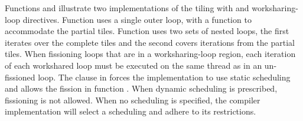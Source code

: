 Functions  and  illustrate two implementations of the tiling
with  and worksharing-loop directives.  Function  uses a single outer loop, with a  function
to accommodate the partial tiles. Function 
uses two sets of nested loops, the first iterates over the complete tiles and the
second covers iterations from the partial tiles. When fissioning loops that
are in a  worksharing-loop region, each iteration of each workshared loop
must be executed on the same thread as in an un-fissioned loop.  The  clause in 
forces the implementation to use static scheduling and allows the fission in function .
When dynamic scheduling is prescribed, fissioning is not allowed.  When no scheduling is specified,
the compiler implementation will select a scheduling  and adhere to its restrictions.

